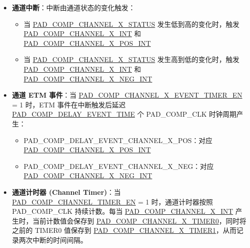 \documentclass[main\_\_CN.tex]{subfiles}
\begin{document}
\begin{itemize}
    PAD\_COMP\_OUT 发生一次跳变并触发中断后，\hyperref[fielddesc:PADCOMPFILTERCNT]{PAD\_COMP\_FILTER\_CNT} 配置一段以 PAD\_COMP\_CLK 时钟周期为单位的去抖时间，在此期间不再触发新的中断，从而抑制输入电压在参考电压附近抖动导致的重复中断。\hyperref[fielddesc:PADCOMPLIMITCNT]{PAD\_COMP\_LIMIT\_CNT} 与 \hyperref[fielddesc:PADCOMPFILTERCNT]{PAD\_COMP\_FILTER\_CNT} 配合使用：前者在采样阶段过滤毛刺，后者在中断触发后抑制重复中断。

    \item \textbf{通道中断}：中断由通道状态的变化触发：
            \begin{itemize}
                \item 当 \hyperref[fielddesc:PADCOMPCHANNEL1STATUS]{PAD\_COMP\_CHANNEL\_X\_STATUS} 发生低到高的变化时，触发 \hyperref[int:PADCOMPnALLINT]{PAD\_COMP\_CHANNEL\_X\_INT} 和 \hyperref[int:PADCOMPnPOSINT]{PAD\_COMP\_CHANNEL\_X\_POS\_INT}
                \item 当 \hyperref[fielddesc:PADCOMPCHANNEL1STATUS]{PAD\_COMP\_CHANNEL\_X\_STATUS} 发生高到低的变化时，触发 \hyperref[int:PADCOMPnALLINT]{PAD\_COMP\_CHANNEL\_X\_INT} 和 \hyperref[int:PADCOMPnNEGINT]{PAD\_COMP\_CHANNEL\_X\_NEG\_INT}
            \end{itemize}
            
   \item \textbf{通道 ETM 事件}：当 \hyperref[fielddesc:PADCOMPCHANNEL1EVENTTIMEREN]{PAD\_COMP\_CHANNEL\_X\_EVENT\_TIMER\_EN} = 1 时，ETM 事件在中断触发后延迟 \hyperref[fielddesc:PADCOMPDELAYEVENTTIME]{PAD\_COMP\_DELAY\_EVENT\_TIME} 个 PAD\_COMP\_CLK 时钟周期产生：
            \begin{itemize}
                \item PAD\_COMP\_DELAY\_EVENT\_CHANNEL\_X\_POS：对应 \hyperref[int:PADCOMPnPOSINT]{PAD\_COMP\_CHANNEL\_X\_POS\_INT}
                \item PAD\_COMP\_DELAY\_EVENT\_CHANNEL\_X\_NEG：对应 \hyperref[int:PADCOMPnNEGINT]{PAD\_COMP\_CHANNEL\_X\_NEG\_INT}
            \end{itemize} 

    \item \textbf{通道计时器 (Channel Timer)}：当 \hyperref[fielddesc:PADCOMPCHANNELTIMEREN]{PAD\_COMP\_CHANNEL\_TIMER\_EN} = 1 时，通道计时器按照 PAD\_COMP\_CLK 持续计数。每当 \hyperref[int:PADCOMPnALLINT]{PAD\_COMP\_CHANNEL\_X\_INT} 产生时，当前计数值会保存到 \hyperref[fielddesc:PADCOMPCHANNEL1TIMER0]{PAD\_COMP\_CHANNEL\_X\_TIMER0}，同时将之前的 TIMER0 值保存到 \hyperref[fielddesc:PADCOMPCHANNEL1TIMER1]{PAD\_COMP\_CHANNEL\_X\_TIMER1}，从而记录两次中断的时间间隔。
        
\end{itemize}
\end{document}
